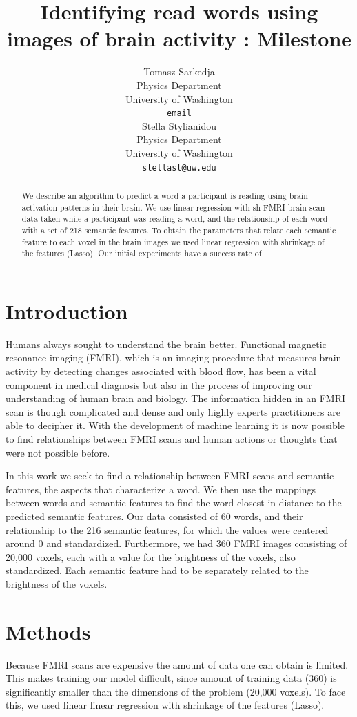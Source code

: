 \documentclass{article} %
\title{Identifying read words using images of brain activity : Milestone}
\author{
Tomasz Sarkedja \\
Physics Department\\
University of Washington\\
\texttt{email} \\
\And
Stella Stylianidou \\
Physics Department\\
University of Washington\\
\texttt{stellast@uw.edu} \\
}
\begin{document}
\maketitle

\begin{abstract}
We describe an algorithm to predict a word a participant is reading using brain activation patterns in their brain. We use linear regression with sh FMRI brain scan data taken while a participant was reading a word, and the relationship of each word with a set of 218 semantic features. To obtain the parameters that relate each semantic feature to each voxel in the brain images we used linear regression with shrinkage of the features (Lasso). Our initial experiments have a success rate of %

\end{abstract}

\section{Introduction}

Humans always sought to understand the brain better. Functional magnetic resonance imaging (FMRI), which is an imaging procedure that measures brain activity by detecting changes associated with blood flow, has been a vital component in medical diagnosis but also in the process of improving our understanding of human brain and biology. The information hidden in an FMRI scan is though complicated and dense and only highly experts practitioners are able to decipher it. With the development of machine learning it is now possible to find relationships between FMRI scans and human actions or thoughts that were not possible before.

In this work we seek to find a relationship between FMRI scans and semantic features, the aspects that characterize a word. We then use the mappings between words and semantic features to find the word closest in distance to the predicted semantic features. Our data consisted of 60 words, and their relationship to the 216 semantic features, for which the values were centered around 0 and standardized. Furthermore, we had 360 FMRI images consisting of 20,000 voxels, each with a value for the brightness of the voxels, also standardized. Each semantic feature had to be separately related to the brightness of the voxels. 


\section{Methods}
\label{gen_inst}
Because FMRI scans are expensive the amount of data one can obtain is limited. This makes training our model difficult, since amount of training data (360) is significantly smaller than  the dimensions of the problem (20,000 voxels). To face this, we used linear linear regression with shrinkage of the features (Lasso).
\end{document}
